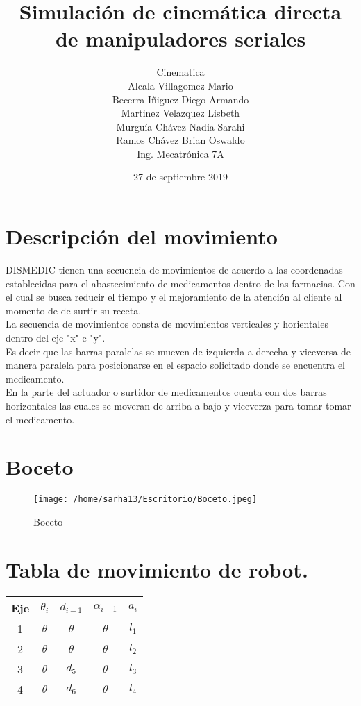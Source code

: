 \documentclass[letter,openridht,12pt,spanish]{report}
\title{\textbf{Simulaci\'on de cinem\'atica directa de manipuladores seriales}}
\author{Cinematica\\
		Alcala Villagomez Mario\\
		Becerra I\~niguez Diego Armando\\
		Martinez Velazquez Lisbeth\\
		Murgu\'ia Ch\'avez Nadia Sarahi\\
		Ramos Ch\'avez Brian Oswaldo\\
		Ing. Mecatr\'onica 7A}
\date{27 de septiembre 2019}
\begin{document}
\maketitle

\section{Descripci\'on del movimiento}

DISMEDIC tienen una secuencia de movimientos de acuerdo a las coordenadas establecidas para el abastecimiento de medicamentos dentro de las farmacias. Con el cual se busca reducir el tiempo y el mejoramiento de la atenci\'on al cliente al momento de de surtir su receta.\\
La secuencia de movimientos consta de movimientos verticales y horientales dentro del eje "x" e "y".\\
Es decir que las barras paralelas se mueven de izquierda a derecha y viceversa de manera paralela para posicionarse en el espacio solicitado donde se encuentra el medicamento.\\
En la parte del actuador o surtidor de medicamentos cuenta con dos barras horizontales las cuales se moveran de arriba a bajo y viceverza para tomar tomar el medicamento.\\

\section{Boceto}

\begin{figure}[htp]
\centering
\texttt{[image: /home/sarha13/Escritorio/Boceto.jpeg]}
\caption{Boceto}
\label{Figura 1.}
\end{figure}

\section{Tabla de movimiento de robot.}

\begin{center}
\begin{tabular}{|c|c|c|c|c|}
\hline
	Eje & $\theta_i$ & $d_{i-1}$ & $\alpha_{i-1}$ & $a_i$\\
\hline
	1 & $\theta$ & $\theta$ & $\theta$ & $l_1$\\
\hline
	2 & $\theta$ & $\theta$ & $\theta$ & $l_2$\\
\hline
	3 & $\theta$ & $d_5$ & $\theta$ & $l_3$\\
\hline
	4 & $\theta$ & $d_6$ & $\theta$ & $l_4$\\
\hline
\end{tabular}
\end{center}
\end{document}
